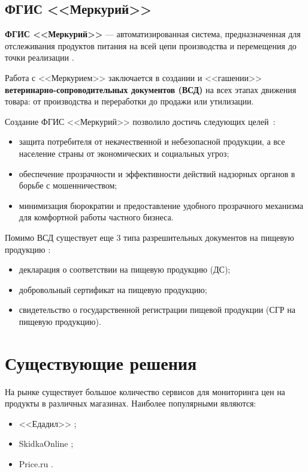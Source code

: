 \subsection*{ФГИС <<Меркурий>>}

\textbf{ФГИС <<Меркурий>>} --- автоматизированная система, предназначенная для отслеживания продуктов питания на всей цепи производства и перемещения до точки реализации \cite{info_mercury}.

Работа с <<Меркурием>> заключается в создании и <<гашении>> \textbf{ветеринарно-сопроводительных документов (ВСД)} на всех этапах движения товара: от производства и переработки до продажи или утилизации.

Создание ФГИС <<Меркурий>> позволило достичь следующих целей~\cite{info_mercury, info_mercury2}:

\begin{itemize}[label=--]
	\item защита потребителя от некачественной и небезопасной продукции, а все население страны от экономических и социальных угроз;
	\item обеспечение прозрачности и эффективности действий надзорных органов в борьбе с мошенничеством;
	\item минимизация бюрократии и предоставление удобного прозрачного механизма для комфортной работы частного бизнеса.
\end{itemize}

Помимо ВСД существует еще 3 типа разрешительных документов на пищевую продукцию \cite{info_certificates}: 

\begin{itemize}[label*=--]
	\item декларация о соответствии на пищевую продукцию (ДС);
	\item добровольный сертификат на пищевую продукцию;
	\item свидетельство о государственной регистрации пищевой продукции (СГР на пищевую продукцию).
\end{itemize}

\clearpage

\section{Существующие решения}

На рынке существует большое количество сервисов для мониторинга цен на продукты в различных магазинах. Наиболее популярными являются:

\begin{itemize}[label=--]
	\item <<Едадил>> \cite{info_edadil};
	\item SkidkaOnline \cite{info_skidka_online};
	\item Price.ru \cite{info_price_ru}.
\end{itemize}

